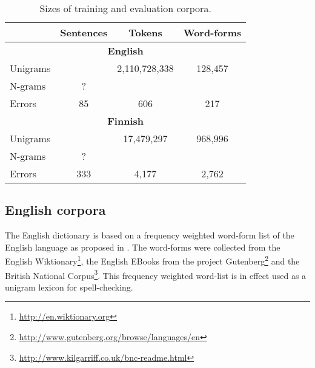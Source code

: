 \documentclass{llncs}
\begin{document}
\begin{table}
    \caption{Sizes of training and evaluation corpora.
    \label{table:corpora}}
  \begin{center}
      \begin{tabular}{lccc}
        \hline
         & Sentences & Tokens & Word-forms \\
        \hline
        \multicolumn{4}{c}{\textbf{English}} \\
        \hline
        Unigrams &  & 2,110,728,338 & 128,457  \\
        N-grams & ? & & \\
        Errors  & 85 & 606 & 217 \\
        \hline
        \multicolumn{4}{c}{\textbf{Finnish}} \\
        \hline
        Unigrams &  & 17,479,297 & 968,996 \\
        N-grams & ? & & \\
        Errors  & 333 & 4,177 & 2,762 \\
        \hline
      \end{tabular}
  \end{center}
\end{table}

\subsection{English corpora}

The English dictionary is based on a frequency weighted word-form list of
the English language as proposed in \cite{norvig/2010}. The word-forms were
collected from the English Wiktionary\footnote{\url{http://en.wiktionary.org}},
the English EBooks from the project
Gutenberg\footnote{\url{http://www.gutenberg.org/browse/languages/en}} and the
British National
Corpus\footnote{\url{http://www.kilgarriff.co.uk/bnc-readme.html}}. This
frequency weighted word-list is in effect used as a unigram lexicon for spell-checking.
\end{document}
